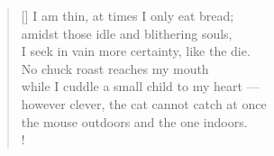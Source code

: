\documentclass[a4paper,12pt,twoside,final]{book}
\begin{document}
\newpage


\settowidth{\versewidth}{however clever, the cat cannot catch at once}

\begin{verse}[\versewidth]
  I am thin, at times I only eat bread; \\
  amidst those idle and blithering souls, \\
  I seek in vain more certainty, like the die. \\
  No chuck roast reaches my mouth \\
  while I cuddle a small child to my heart --- \\
  however clever, the cat cannot catch at once \\
  the mouse outdoors and the one indoors. \\!
\end{verse}


\newpage

\settowidth{\versewidth}{számhoz s szivemhez kisgyerek ---}
\end{document}
